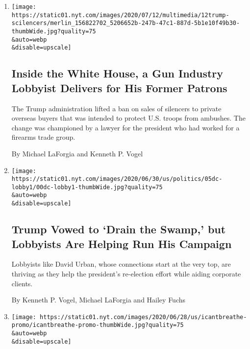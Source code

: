 \begin{enumerate}
\def\labelenumi{\arabic{enumi}.}
\item
  \href{/2020/07/13/us/trump-gun-silencer-exports.html}{}

  \texttt{[image: https://static01.nyt.com/images/2020/07/12/multimedia/12trump-scilencers/merlin\_156822702\_5206652b-247b-47c1-887d-5b1e10f49b30-thumbWide.jpg?quality=75\\\&auto=webp\\\&disable=upscale]}

  \hypertarget{inside-the-white-house-a-gun-industry-lobbyist-delivers-for-his-former-patrons}{%
  \subsection{Inside the White House, a Gun Industry Lobbyist Delivers
  for His Former
  Patrons}\label{inside-the-white-house-a-gun-industry-lobbyist-delivers-for-his-former-patrons}}

  The Trump administration lifted a ban on sales of silencers to private
  overseas buyers that was intended to protect U.S. troops from
  ambushes. The change was championed by a lawyer for the president who
  had worked for a firearms trade group.

  By Michael LaForgia and Kenneth P. Vogel
\item
  \href{/2020/07/06/us/politics/trump-lobbyists-swamp-campaign.html}{}

  \texttt{[image: https://static01.nyt.com/images/2020/06/30/us/politics/05dc-lobby1/00dc-lobby1-thumbWide.jpg?quality=75\\\&auto=webp\\\&disable=upscale]}

  \hypertarget{trump-vowed-to-drain-the-swamp-but-lobbyists-are-helping-run-his-campaign}{%
  \subsection{Trump Vowed to `Drain the Swamp,' but Lobbyists Are
  Helping Run His
  Campaign}\label{trump-vowed-to-drain-the-swamp-but-lobbyists-are-helping-run-his-campaign}}

  Lobbyists like David Urban, whose connections start at the very top,
  are thriving as they help the president's re-election effort while
  aiding corporate clients.

  By Kenneth P. Vogel, Michael LaForgia and Hailey Fuchs
\item
  \href{/interactive/2020/06/28/us/i-cant-breathe-police-arrest.html}{}

  \texttt{[image: https://static01.nyt.com/images/2020/06/28/us/icantbreathe-promo/icantbreathe-promo-thumbWide.jpg?quality=75\\\&auto=webp\\\&disable=upscale]}


\end{enumerate}
